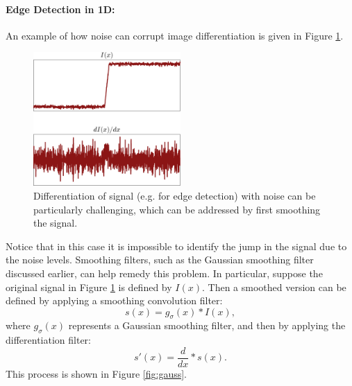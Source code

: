 \paragraph{Edge Detection in 1D:}
An example of how noise can corrupt image differentiation is given in Figure \ref{fig:noisy}. 
\begin{figure}[ht]
  \centering
  \includegraphics[width=0.5\textwidth]{tex/figs/ch11_figs/edge_detection.png}
    \caption{Differentiation of signal (e.g. for edge detection) with noise can be particularly challenging, which can be addressed by first smoothing the signal.}
    \label{fig:noisy}
\end{figure}
Notice that in this case it is impossible to identify the jump in the signal due to the noise levels.
Smoothing filters, such as the Gaussian smoothing filter discussed earlier, can help remedy this problem. In particular, suppose the original signal in Figure \ref{fig:noisy} is defined by $I(x)$. Then a smoothed version can be defined by applying a smoothing convolution filter:
\begin{equation*}
s(x) = g_\sigma(x) \ast I(x),
\end{equation*}
where $g_\sigma(x)$ represents a Gaussian smoothing filter, and then by applying the differentiation filter:
\begin{equation*}
s'(x)=\frac{d}{dx}\ast s(x).
\end{equation*}
This process is shown in Figure \ref{fig:gauss}.
